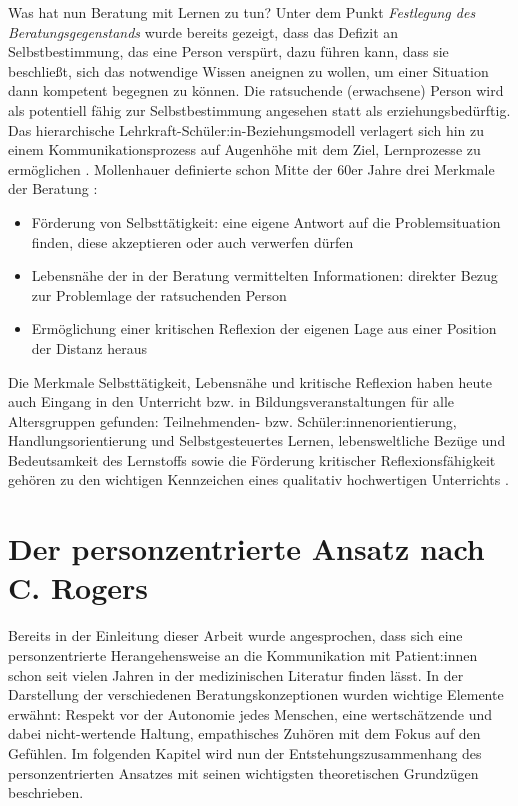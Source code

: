 \documentclass[
  twoside,
  parskip=half-,
]{scrreprt}
\begin{document}
Was hat nun Beratung mit Lernen zu tun? Unter dem Punkt \textit{Festlegung des Beratungsgegenstands} wurde bereits gezeigt, dass das Defizit an Selbstbestimmung, das eine Person verspürt, dazu führen kann, dass sie beschließt, sich das notwendige Wissen aneignen zu wollen, um einer Situation dann kompetent begegnen zu können.  Die ratsuchende (erwachsene) Person wird als potentiell fähig zur Selbstbestimmung angesehen statt als erziehungsbedürftig. Das hierarchische Lehrkraft-Schüler:in-Beziehungsmodell verlagert sich hin zu einem Kommunikationsprozess auf Augenhöhe mit dem Ziel, Lernprozesse zu ermöglichen \autocite[vgl.][188]{dinkelaker}. Mollenhauer definierte schon Mitte der 60er Jahre drei Merkmale der Beratung \autocite[Mollenhauer 1965, zit.nach][189]{dinkelaker}:
\begin{itemize}
  \item Förderung von Selbsttätigkeit: eine eigene Antwort auf die Problemsituation finden, diese akzeptieren oder auch verwerfen dürfen
  \item Lebensnähe der in der Beratung vermittelten Informationen: direkter Bezug zur Problemlage der ratsuchenden Person
  \item Ermöglichung einer kritischen Reflexion der eigenen Lage aus einer Position der Distanz heraus
\end{itemize}

Die Merkmale Selbsttätigkeit, Lebensnähe und kritische Reflexion haben heute auch Eingang in den Unterricht bzw. in Bildungsveranstaltungen für alle Altersgruppen gefunden: Teilnehmenden- bzw. Schüler:innenorientierung, Handlungsorientierung und Selbstgesteuertes Lernen, lebensweltliche Bezüge und Bedeutsamkeit des Lernstoffs sowie die Förderung kritischer Reflexionsfähigkeit gehören zu den wichtigen Kennzeichen eines qualitativ hochwertigen Unterrichts \autocite[vgl.][Kap. 5.3]{hippel}.

\chapter{Der personzentrierte Ansatz nach C. Rogers}\label{chapter:rogers}

Bereits in der Einleitung dieser Arbeit wurde angesprochen, dass sich eine personzentrierte Herangehensweise an die Kommunikation mit Patient:innen schon seit vielen Jahren in der medizinischen Literatur finden lässt. In der Darstellung der verschiedenen Beratungskonzeptionen wurden wichtige Elemente erwähnt: Respekt vor der Autonomie jedes Menschen, eine wertschätzende und dabei nicht-wertende Haltung, empathisches Zuhören mit dem Fokus auf den Gefühlen. Im folgenden Kapitel wird nun der Entstehungszusammenhang des personzentrierten Ansatzes mit seinen wichtigsten theoretischen Grundzügen beschrieben. 
\end{document}
